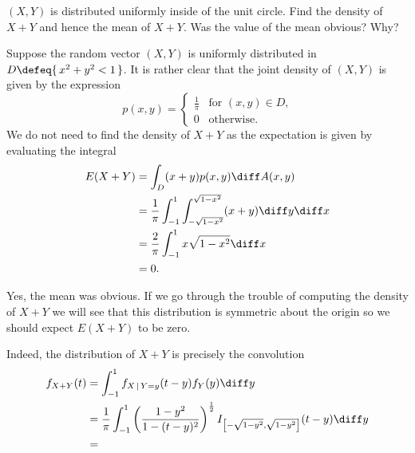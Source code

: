 \begin{problem}[Handout 18, \# 15]
  \((X,Y)\) is distributed uniformly inside of the unit circle. Find the
  density of \(X+Y\) and hence the mean of \(X+Y\). Was the value of the
  mean obvious? Why?
\end{problem}
\begin{solution}
  Suppose the random vector \((X,Y)\) is uniformly distributed in
  \(D\defeq \{\,x^2+y^2<1\,\}\). It is rather clear that the joint density
  of \((X,Y)\) is given by the expression
  \[
    p(x,y)=
    \begin{cases}
      \frac{1}{\pi}&\text{for \((x,y)\in D\),}\\
      0&\text{otherwise.}
    \end{cases}
  \]
  We do not need to find the density of \(X+Y\) as the expectation is given
  by evaluating the integral
  \begin{align*}
    E(X+Y)
    &=\int_D (x+y)p(x,y)\diff A(x,y)\\
    &=\frac{1}{\pi}\int_{-1}^1\int_{-\sqrt{1-x^2}}^{\sqrt{1-x^2}} (x+y)\diff
      y\diff x\\
    &=\frac{2}{\pi}\int_{-1}^1x\sqrt{1-x^2}\diff x\\
    &=0.
  \end{align*}

  Yes, the mean was obvious. If we go through the trouble of computing the
  density of \(X+Y\) we will see that this distribution is symmetric about
  the origin so we should expect \(E(X+Y)\) to be zero.

  Indeed, the distribution of \(X+Y\) is precisely the convolution
  \begin{align*}
   f_{X+Y}(t)
    &=\int_{-1}^1 f_{X\,|\,Y=y}(t-y)f_Y(y)\diff y\\
    &=\frac{1}{\pi}\int_{-1}^1
      \left(\frac{1-y^2}{1-(t-y)^2}\right)^{\frac{1}{2}}
      I_{\left[-\sqrt{1-y^2},\sqrt{1-y^2}\right]}(t-y)\diff y\\
    &=
  \end{align*}
\end{solution}
\newpage

